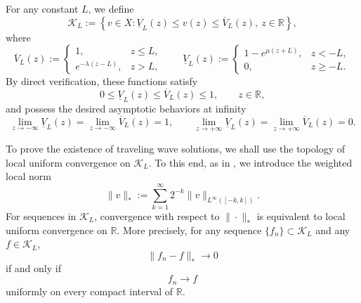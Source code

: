 \documentclass[preprint,sort&compress,final,12pt]{elsarticle}
\numberwithin{equation}{section}
\begin{document}
For any constant $L$, we define
\begin{equation*}
\mathcal K_L:=\left\{v\in X: \underline V_L(z)\le v(z)\le\overline V_L(z),\ z\in\mathbb R\right\},
\end{equation*}
where
\begin{equation*}
\overline V_L(z):=\begin{cases}
1, & z\le L,\\[0.2cm]
e^{-\lambda(z-L)}, & z>L,
\end{cases}\qquad
\underline V_L(z):=\begin{cases}
1-e^{\mu(z+L)}, & z<-L,\\[0.2cm]
0, & z\ge -L.
\end{cases}
\end{equation*}
By direct verification, these functions satisfy
\begin{equation}\label{eq:barrier-order-L}
0\le \underline V_L(z)\le \overline V_L(z)\le1,\qquad z\in\mathbb R,
\end{equation}
and possess the desired asymptotic behaviors at infinity
\begin{equation}\label{eq:barrier-limits-L}
\lim_{z\to-\infty}\underline V_L(z)=\lim_{z\to-\infty}\overline V_L(z)=1,\qquad
\lim_{z\to+\infty}\underline V_L(z)=\lim_{z\to+\infty}\overline V_L(z)=0.
\end{equation}

To prove the existence of traveling wave solutions, we shall use the topology of  local uniform convergence on $\mathcal K_L$. To this end, as in \cite{cellular necrosis}, we introduce the weighted local norm
\begin{equation*}
\|v\|_*:=\sum_{k=1}^{\infty}2^{-k}\|v\|_{L^\infty([-k,k])}.
\end{equation*}
For sequences in $\mathcal K_L$, convergence with respect to $\|\cdot\|_*$ is equivalent to  local uniform convergence on $\mathbb R$. More precisely, for any sequence $\{f_n\}\subset \mathcal K_L$ and any $f\in\mathcal K_L$,
\begin{equation*}
\|f_n-f\|_*\to0
\end{equation*}
if and only if
\begin{equation*}
f_n\to f
\end{equation*}
uniformly on every compact interval of $\mathbb R$. 
\end{document}
